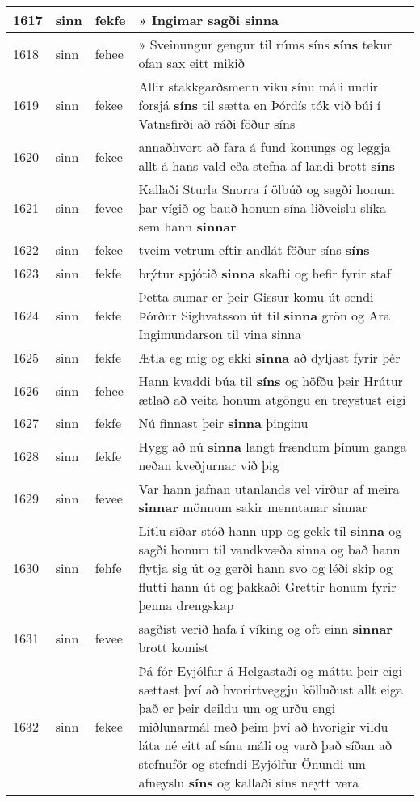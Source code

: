 \documentclass{article}
\begin{document}
\begin{longtable}{p{1cm}|p{1cm}|p{1cm}|p{13cm}}
\hline
1617&sinn&fekfe&» Ingimar sagði \textbf{sinna} \\
\hline
1618&sinn&fehee&» Sveinungur gengur til rúms síns \textbf{síns} tekur ofan sax eitt mikið\\
\hline
1619&sinn&fekee&Allir stakkgarðsmenn viku sínu máli undir forsjá \textbf{síns} til sætta en Þórdís tók við búi í Vatnsfirði að ráði föður síns\\
\hline
1620&sinn&fekee&annaðhvort að fara á fund konungs og leggja allt á hans vald eða stefna af landi brott \textbf{síns} \\
\hline
1621&sinn&fevee&Kallaði Sturla Snorra í ölbúð og sagði honum þar vígið og bauð honum sína liðveislu slíka sem hann \textbf{sinnar} \\
\hline
1622&sinn&fekee&tveim vetrum eftir andlát föður síns \textbf{síns} \\
\hline
1623&sinn&fekfe&brýtur spjótið \textbf{sinna} skafti og hefir fyrir staf\\
\hline
1624&sinn&fekfe&Þetta sumar er þeir Gissur komu út sendi Þórður Sighvatsson út til \textbf{sinna} grön og Ara Ingimundarson til vina sinna\\
\hline
1625&sinn&fekfe&Ætla eg mig og ekki \textbf{sinna} að dyljast fyrir þér\\
\hline
1626&sinn&fehee&Hann kvaddi búa til \textbf{síns} og höfðu þeir Hrútur ætlað að veita honum atgöngu en treystust eigi\\
\hline
1627&sinn&fekfe&Nú finnast þeir \textbf{sinna} þinginu\\
\hline
1628&sinn&fekfe&Hygg að nú \textbf{sinna} langt frændum þínum ganga neðan kveðjurnar við þig\\
\hline
1629&sinn&fevee&Var hann jafnan utanlands vel virður af meira \textbf{sinnar} mönnum sakir menntanar sinnar\\
\hline
1630&sinn&fehfe&Litlu síðar stóð hann upp og gekk til \textbf{sinna} og sagði honum til vandkvæða sinna og bað hann flytja sig út og gerði hann svo og léði skip og flutti hann út og þakkaði Grettir honum fyrir þenna drengskap\\
\hline
1631&sinn&fevee&sagðist verið hafa í víking og oft einn \textbf{sinnar} brott komist\\
\hline
1632&sinn&fekee&Þá fór Eyjólfur á Helgastaði og máttu þeir eigi sættast því að hvorirtveggju kölluðust allt eiga það er þeir deildu um og urðu engi miðlunarmál með þeim því að hvorigir vildu láta né eitt af sínu máli og varð það síðan að stefnuför og stefndi Eyjólfur Önundi um afneyslu \textbf{síns} og kallaði síns neytt vera\\

\end{longtable}
\end{document}
